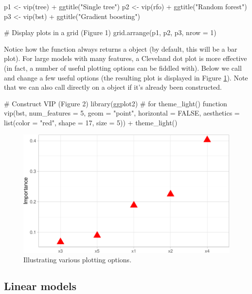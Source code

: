 \begin{Schunk}
\begin{Sinput}
p1 <- vip(tree) + ggtitle("Single tree")
p2 <- vip(rfo) + ggtitle("Random forest")
p3 <- vip(bst) + ggtitle("Gradient boosting")

# Display plots in a grid (Figure 1)
grid.arrange(p1, p2, p3, nrow = 1)
\end{Sinput}
\end{Schunk}

Notice how the  function always returns a 
object (by default, this will be a bar plot). For large models with many
features, a Cleveland dot plot is more effective (in fact, a number of
useful plotting options can be fiddled with). Below we call 
and change a few useful options (the resulting plot is displayed in
Figure \ref{fig:dot-plot}). Note that we can also call 
directly on a  object if it's already been constructed.

\begin{Schunk}
\begin{Sinput}
# Construct VIP (Figure 2)
library(ggplot2)  # for theme_light() function
vip(bst, num_features = 5, geom = "point", horizontal = FALSE,
    aesthetics = list(color = "red", shape = 17, size = 5)) +
  theme_light()
\end{Sinput}
\begin{figure}[!htb]

{\centering \includegraphics[width=0.7\linewidth]{greenwell-boehmke_files/figure-latex/dot-plot-1}

}

\caption[Illustrating various plotting options]{Illustrating various plotting options.}\label{fig:dot-plot}
\end{figure}
\end{Schunk}

\hypertarget{linear-models}{%
\subsection{Linear models}\label{linear-models}}

